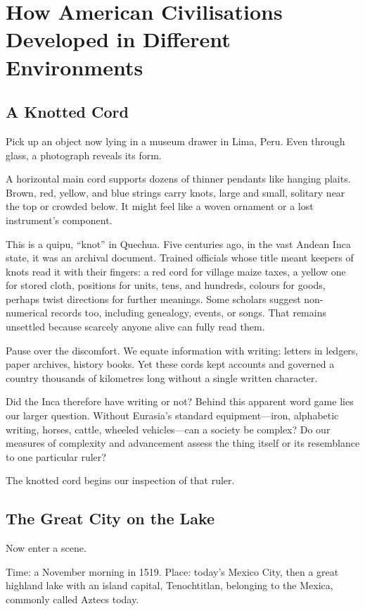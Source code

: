\chapter[American Civilisations]{How American Civilisations Developed in Different Environments}
\section{A Knotted Cord}
Pick up an object now lying in a museum drawer in Lima, Peru. Even through glass, a photograph reveals its form.

A horizontal main cord supports dozens of thinner pendants like hanging plaits. Brown, red, yellow, and blue strings carry knots, large and small, solitary near the top or crowded below. It might feel like a woven ornament or a lost instrument's component.

This is a quipu, ``knot'' in Quechua. Five centuries ago, in the vast Andean Inca state, it was an archival document. Trained officials whose title meant keepers of knots read it with their fingers: a red cord for village maize taxes, a yellow one for stored cloth, positions for units, tens, and hundreds, colours for goods, perhaps twist directions for further meanings. Some scholars suggest non-numerical records too, including genealogy, events, or songs. That remains unsettled because scarcely anyone alive can fully read them.

Pause over the discomfort. We equate information with writing: letters in ledgers, paper archives, history books. Yet these cords kept accounts and governed a country thousands of kilometres long without a single written character.

Did the Inca therefore have writing or not? Behind this apparent word game lies our larger question. Without Eurasia's standard equipment---iron, alphabetic writing, horses, cattle, wheeled vehicles---can a society be complex? Do our measures of complexity and advancement assess the thing itself or its resemblance to one particular ruler?

The knotted cord begins our inspection of that ruler.

\section{The Great City on the Lake}
Now enter a scene.

Time: a November morning in 1519. Place: today's Mexico City, then a great highland lake with an island capital, Tenochtitlan, belonging to the Mexica, commonly called Aztecs today.

